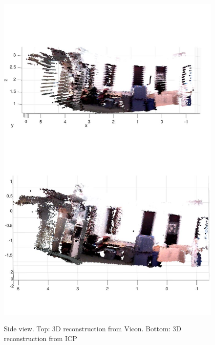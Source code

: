 \documentclass[letterpaper, 10 pt, conference]{ieeeconf}  %
\begin{document}
\begin{figure}
\centering
\includegraphics[width=\columnwidth]{viconicp_side.jpg}\\
\caption{Side view. Top: 3D reconstruction from Vicon. Bottom: 3D reconstruction from ICP}
\label{fig:viconicp_side}
\end{figure}
\end{document}
